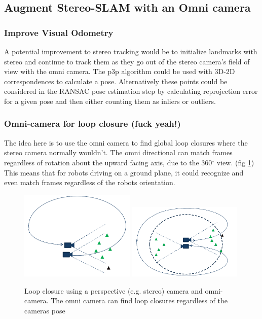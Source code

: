 \subsection{Augment Stereo-SLAM with an Omni camera}

\subsubsection{Improve Visual Odometry}

A potential improvement to stereo tracking would be to initialize landmarks with stereo and continue to track them as they go out of the stereo camera's field of view with the omni camera.  The p3p algorithm could be used with 3D-2D correspondences to calculate a pose.  Alternatively these points could be considered in the RANSAC pose estimation step by calculating reprojection error for a given pose and then either counting them as inliers or outliers.

\subsubsection{Omni-camera for loop closure (fuck yeah!)}

The idea here is to use the omni camera to find global loop closures where the stereo camera normally wouldn't.  The omni directional can match frames regardless of rotation about the upward facing axis, due to the 360$^{\circ}$ view.  (fig \ref{fig:omni_loop_close}) This means that for robots driving on a ground plane, it could recognize and even match frames regardless of the robots orientation.

\begin{figure}[h!]
  \centering
    \includegraphics[width=0.49\textwidth]{chapters/images/stereo_loop}
    \includegraphics[width=0.49\textwidth]{chapters/images/omni_loop} 
    \caption{Loop closure using a perspective (e.g. stereo) camera and omni-camera.  The omni camera can find loop closures regardless of the cameras pose}
  \label{fig:omni_loop_close}
\end{figure}

